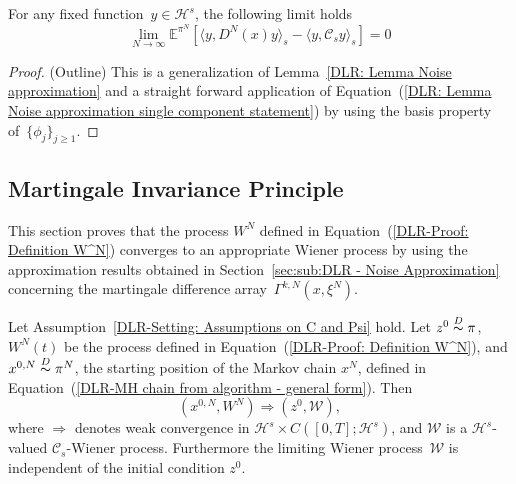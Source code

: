 \begin{cor}\autocite[Corollary 4.9]{Pillai2012} 
  \label{DLR: Corollary Noise approximation}
 For any fixed function~$y \in \mathcal{H}^s$, the following limit holds
 \begin{equation}
  \lim_{N \to \infty} \mathbb{E}^{\pi^N}[\langle y, D^N(x) y \rangle_s - \langle y, \mathcal{C}_s y \rangle_s] = 0
 \end{equation}

\end{cor}
\begin{proof}(Outline)
  This is a generalization of Lemma~\ref{DLR: Lemma Noise approximation} and a straight forward application of Equation~(\ref{DLR: Lemma Noise approximation single component statement}) by using the basis property of~$\{ \phi_j \}_{j \geq 1} $.
\end{proof}


 
\subsection{Martingale Invariance Principle}
\label{Martingale invariance principle}

This section proves that the process $ W^{N} $ defined in Equation~(\ref{DLR-Proof: Definition W^N}) converges to an appropriate Wiener process by using the approximation results obtained in Section~\ref{sec:sub:DLR - Noise Approximation} concerning the martingale difference array~$\Gamma^{k,N}(x, \xi^N)$.

\begin{proposition}
 \label{Invariance principle}
 Let Assumption~\ref{DLR-Setting: Assumptions on C and Psi} hold. Let $ z^0 \stackrel{D}{\thicksim} \pi $,  $ W^{N}(t) $ be the process defined in Equation~(\ref{DLR-Proof: Definition W^N}), and $ x^{0,N} \stackrel{D}{\thicksim} \pi^{N} $, the starting position of the Markov chain $ x^{N} $, defined in Equation~(\ref{DLR-MH chain from algorithm - general form}). Then
 \begin{equation}
  (x^{0,N}, W^{N}) \Longrightarrow (z^0, \mathcal{W}),
 \end{equation}
 where $ \Longrightarrow $ denotes weak convergence in $ \mathcal{H}^s \times C \left( [0,T]; \mathcal{H}^s \right) $, and $ \mathcal{W}$ is a $ \mathcal{H}^s $-valued  $ \mathcal{C}_s $-Wiener process. Furthermore the limiting Wiener process~$ \mathcal{W} $ is independent of the initial condition $ z^0 $.
 
\end{proposition}



